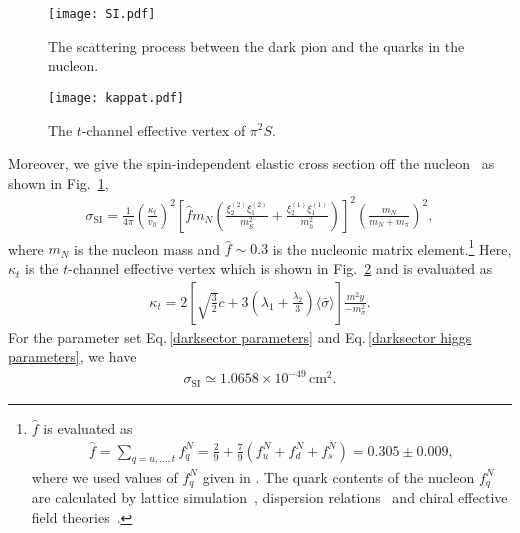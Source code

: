 \documentclass[a4paper,preprint,superscriptaddress,preprintnumbers,nofootinbib]{revtex4}
\newcommand{\al}[1]{\begin{align}#1\end{align}}
\newcommand{\bra}{\langle}
\newcommand{\ket}{\rangle}
\begin{document}
\begin{figure}
\begin{center}
\texttt{[image: SI.pdf]}
\end{center}
\caption{The scattering process between the dark pion and the quarks in the nucleon. }
\label{cross section off}
\end{figure}
\begin{figure}
\begin{center}
\texttt{[image: kappat.pdf]}
\end{center}
\caption{The $t$-channel effective vertex of $\pi^2S$.}
\label{t channel vertex}
\end{figure}
Moreover, we give the spin-independent elastic cross section off the nucleon~\cite{Barbieri:2006dq} as shown in Fig.~\ref{cross section off}, 
\al{
\sigma_\text{SI}=\frac{1}{4\pi}\left(\frac{\kappa_t }{v_h}\right)^2\left[ {\hat f}m_N\left( \frac{\xi_2^{(2)}\xi_1^{(2)}}{m_S^2} +\frac{\xi_2^{(1)}\xi_1^{(1)}}{m_h^2}\right) \right]^2\left( \frac{m_N}{m_N+m_\pi}\right)^2,
}
where $m_N$ is the nucleon mass and ${\hat f}\sim 0.3$ is the nucleonic matrix element.\footnote{
$\hat f$ is evaluated as
\al{
\hat f=\sum_{q=u,...,t}f_q^N=\frac{2}{9}+\frac{7}{9}(f_u^N+f_d^N+f_s^N)= 0.305\pm 0.009,
\nonumber
}
where we used values of  $f_q^N$ given in \cite{Hoferichter:2015dsa}.
The quark contents of the nucleon $f_q^N$ are calculated by lattice simulation~\cite{Oksuzian:2012rzb,Junnarkar:2013ac}, dispersion relations~\cite{Hoferichter:2015dsa} and chiral effective field theories~\cite{Alarcon:2011zs,Alarcon:2012nr}.}
Here, $\kappa_t$ is the $t$-channel effective vertex which is shown in Fig.~\ref{t channel vertex} and is evaluated as
\al{
\kappa_t=2\left[\sqrt{\frac{3}{2}}c
+3\left(\lambda_1+\frac{\lambda_2}{3}\right)\bra \bar\sigma \ket
\right]\frac{m^2y}{-m_\sigma^2}.
}
\label{kappat}
For the parameter set Eq.\,\eqref{darksector parameters} and Eq.\,\eqref{darksector higgs parameters}, we have
\al{
\sigma_\text{SI}\simeq 1.0658\times 10^{-49}\,\text{cm}^2.
}
\end{document}
